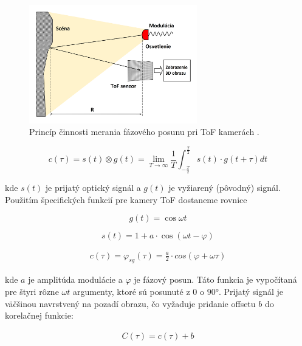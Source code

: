\begin{figure}[H]
	\centering
	\includegraphics[width=0.65\textwidth]{figures/tof.png}
	\caption{Princíp činnosti merania fázového posunu pri ToF kamerách \cite{Lianhua}.}
	\label{fig::tof}
\end{figure}

\begin{equation}
\label{eq::tof::01}
c(\tau) = s(t) \otimes g(t) = \lim_{T \to \infty} {\frac{1}{T}} \int_{-\frac{T}{2}}^{\frac{T}{2}}{s(t) \cdot g(t+ \tau)}dt
\end{equation}


\noindent kde $s(t)$ je prijatý optický signál a $g(t)$ je vyžiarený (pôvodný) signál. Použitím špecifických funkcií pre kamery ToF dostaneme rovnice

\begin{equation}
\label{eq::tof::02}
g(t) = \cos{\omega t}
\end{equation}

\begin{equation}
\label{eq::tof::03}
s(t) = 1+a\cdot \cos{(\omega t - \varphi)}
\end{equation}

\begin{equation}
\label{eq::tof::04}
\begin{aligned}
c(\tau) = \varphi_{sg}(\tau) =  {{\frac{a}{2}} \cdot cos(\varphi + \omega \tau)}
\end{aligned}
\end{equation}

\noindent kde $a$ je amplitúda modulácie a $\varphi$ je fázový posun.
\noindent Táto funkcia je vypočítaná pre štyri rôzne $\omega t$ argumenty, ktoré sú posunuté z 0 o $\ang{90}$.
Prijatý signál je väčšinou navrstvený na pozadí obrazu, čo vyžaduje pridanie offsetu $ b $ do korelačnej funkcie:

\begin{equation}
\label{eq::tof::05}
\begin{aligned}
C(\tau) = c(\tau) + b
\end{aligned}
\end{equation}

